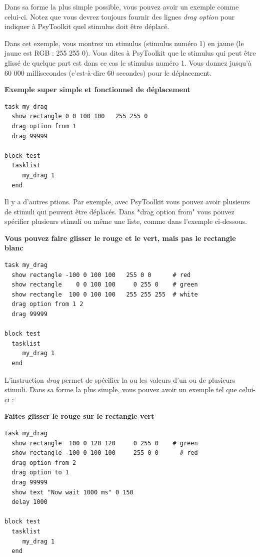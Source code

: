 \documentclass[
]{book}
\begin{document}
Dans sa forme la plus simple possible, vous pouvez avoir un exemple comme celui-ci. Notez que vous devrez toujours fournir des lignes \emph{drag option} pour indiquer à PsyToolkit quel stimulus doit être déplacé.

Dans cet exemple, vous montrez un stimulus (stimulus numéro 1) en jaune (le jaune est RGB : 255 255 0). Vous dites à PsyToolkit que le stimulus qui peut être glissé de quelque part est dans ce cas le stimulus numéro 1. Vous donnez jusqu'à 60 000 millisecondes (c'est-à-dire 60 secondes) pour le déplacement.

\textbf{Exemple super simple et fonctionnel de déplacement}

\begin{verbatim}
task my_drag
  show rectangle 0 0 100 100   255 255 0
  drag option from 1
  drag 99999

block test
  tasklist
     my_drag 1
  end
\end{verbatim}

Il y a d'autres ptions. Par exemple, avec PsyToolkit vous pouvez avoir plusieurs de stimuli qui peuvent être déplacés. Dans *drag option from" vous pouvez spécifier plusieurs stimuli ou même une liste, comme dans l'exemple ci-dessous.

\textbf{Vous pouvez faire glisser le rouge et le vert, mais pas le rectangle blanc}

\begin{verbatim}
task my_drag
  show rectangle -100 0 100 100   255 0 0      # red
  show rectangle    0 0 100 100     0 255 0    # green
  show rectangle  100 0 100 100   255 255 255  # white
  drag option from 1 2
  drag 99999

block test
  tasklist
     my_drag 1
  end
\end{verbatim}

L'instruction \emph{drag} permet de spécifier la ou les valeurs d'un ou de plusieurs stimuli. Dans sa forme la plus simple, vous pouvez avoir un exemple tel que celui-ci :

\textbf{Faites glisser le rouge sur le rectangle vert}

\begin{verbatim}
task my_drag
  show rectangle  100 0 120 120     0 255 0    # green
  show rectangle -100 0 100 100     255 0 0      # red
  drag option from 2
  drag option to 1
  drag 99999
  show text "Now wait 1000 ms" 0 150
  delay 1000

block test
  tasklist
     my_drag 1
  end
\end{verbatim}
\end{document}
